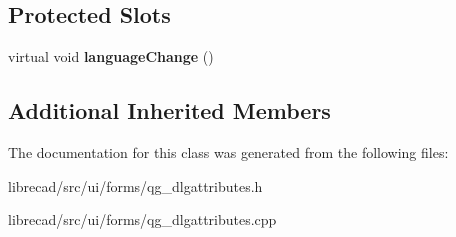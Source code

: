 \subsection*{Protected Slots}
\begin{DoxyCompactItemize}
\item 
\hypertarget{classQG__DlgAttributes_aeccafdfa804656dd5e83a7ac9d68d1bc}{virtual void {\bfseries language\-Change} ()}\label{classQG__DlgAttributes_aeccafdfa804656dd5e83a7ac9d68d1bc}

\end{DoxyCompactItemize}
\subsection*{Additional Inherited Members}


The documentation for this class was generated from the following files\-:\begin{DoxyCompactItemize}
\item 
librecad/src/ui/forms/qg\-\_\-dlgattributes.\-h\item 
librecad/src/ui/forms/qg\-\_\-dlgattributes.\-cpp\end{DoxyCompactItemize}
